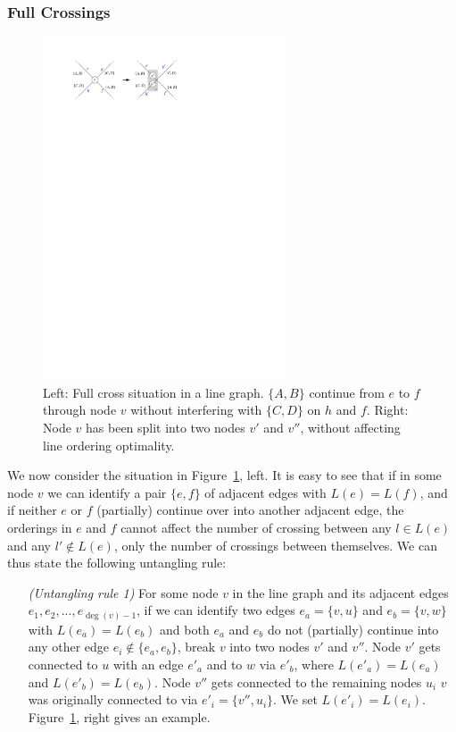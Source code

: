 \documentclass[format=acmsmall, review=false, screen=true]{acmart}
\begin{document}
\subsubsection{Full Crossings}

\begin{figure}
  \centering
  \includegraphics[width=0.64\textwidth]{untangling/fullcross.pdf}
  \caption{Left: Full cross situation in a line graph. $\{A, B\}$ continue from $e$ to $f$ through node $v$ without interfering with $\{C, D\}$ on $h$ and $f$. Right: Node $v$ has been split into two nodes $v'$ and $v''$, without affecting line ordering optimality.}  
  \label{FIG:untangle_fullcross}
\end{figure}

We now consider the situation in Figure~\ref{FIG:untangle_fullcross}, left.
It is easy to see that if in some node $v$ we can identify a pair $\{e, f\}$ of adjacent edges with $L(e) = L(f)$, and if neither $e$ or $f$ (partially) continue over into another adjacent edge, the orderings in $e$ and $f$ cannot affect the number of crossing between any $l \in L(e)$ and any $l' \not\in L(e)$, only the number of crossings between themselves.
We can thus state the following untangling rule:
\begin{enumerate}[parsep=0.5mm, wide, labelwidth=0mm, itemindent=2.3mm]
  \setlength\itemsep{1pt}
  \item[\emph{(Untangling rule 1)}] For some node $v$ in the line graph and its adjacent edges $e_1, e_2, ..., e_{\deg(v)-1}$, if we can identify two edges $e_a = \{v, u\}$ and $e_b = \{v, w\}$ with $L(e_a) = L(e_b)$ and both $e_a$ and $e_b$ do not (partially) continue into any other edge $e_i \not\in \{e_a, e_b\}$, break $v$ into two nodes $v'$ and $v''$.
  Node $v'$ gets connected to $u$ with an edge $e'_a$ and to $w$ via $e'_b$, where $L(e'_a) = L(e_a)$ and $L(e'_b) = L(e_b)$. Node $v''$ gets connected to the remaining nodes $u_i$ $v$ was originally connected to via $e'_i = \{v'', u_i\}$. We set $L(e'_i) = L(e_i)$. Figure~\ref{FIG:untangle_fullcross}, right gives an example.
\end{enumerate}
\end{document}
